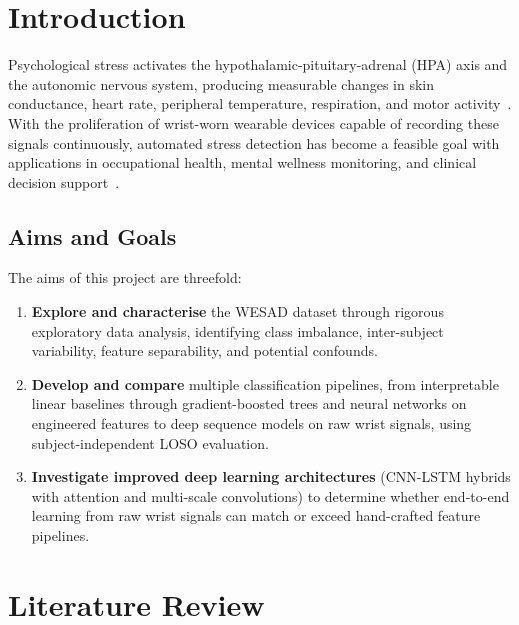 \documentclass[11pt]{article}
\begin{document}
\section{Introduction}
\label{sec:intro}

Psychological stress activates the hypothalamic-pituitary-adrenal (HPA) axis and the autonomic nervous system, producing measurable changes in skin conductance, heart rate, peripheral temperature, respiration, and motor activity~\cite{schmidt2018wesad}.
With the proliferation of wrist-worn wearable devices capable of recording these signals continuously, automated stress detection has become a feasible goal with applications in occupational health, mental wellness monitoring, and clinical decision support~\cite{can2019stress}.

\subsection{Aims and Goals}

The aims of this project are threefold:
\begin{enumerate}    \item \textbf{Explore and characterise} the WESAD dataset through rigorous exploratory data analysis, identifying class imbalance, inter-subject variability, feature separability, and potential confounds.
    \item \textbf{Develop and compare} multiple classification pipelines, from interpretable linear baselines through gradient-boosted trees and neural networks on engineered features to deep sequence models on raw wrist signals, using subject-independent LOSO evaluation.
    \item \textbf{Investigate improved deep learning architectures} (CNN-LSTM hybrids with attention and multi-scale convolutions) to determine whether end-to-end learning from raw wrist signals can match or exceed hand-crafted feature pipelines.
\end{enumerate}


\section{Literature Review}
\label{sec:litreview}
\end{document}

